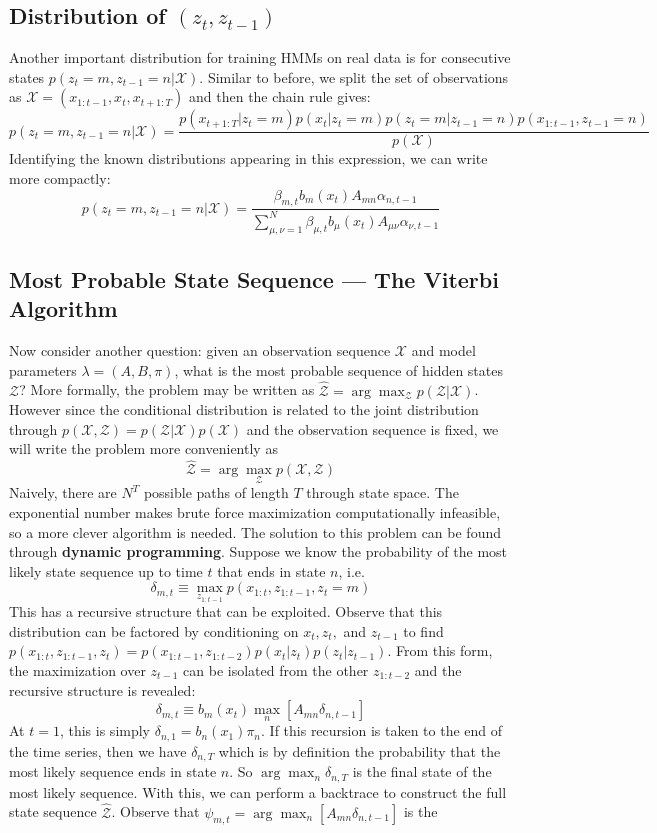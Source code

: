 \documentclass[onecolumn]{gwclass}
\begin{document}
	\subsection{Distribution of $(z_t,z_{t-1})$}
	Another important distribution for training HMMs on real data is for consecutive states $p(z_t=m,z_{t-1}=n|\mathcal{X})$. Similar to before, we split the set of observations as $\mathcal{X}=(x_{1:t-1}, x_t, x_{t+1:T})$ and then the chain rule gives:
	$$p(z_t=m,z_{t-1}=n|\mathcal{X}) = \frac{p(x_{t+1:T}|z_t=m)p(x_t|z_t=m)p(z_t=m|z_{t-1}=n)p(x_{1:t-1},z_{t-1}=n)}{p(\mathcal{X})}$$
	Identifying the known distributions appearing in this expression, we can write more compactly:
	$$ p(z_t=m,z_{t-1}=n|\mathcal{X}) = \frac{\beta_{m,t}b_m(x_t)A_{mn}\alpha_{n,t-1} }{\sum_{\mu,\nu=1}^N \beta_{\mu,t}b_\mu(x_t)A_{\mu\nu}\alpha_{\nu,t-1} } $$
	
	\subsection{Most Probable State Sequence --- The Viterbi Algorithm}
	Now consider another question: given an observation sequence $\mathcal{X}$ and model parameters $\lambda=(A,B,\pi)$, what is the most probable sequence of hidden states $\mathcal{Z}$? More formally, the problem may be written as $ \hat{\mathcal{Z}} = \arg\max_\mathcal{Z} p(\mathcal{Z}|\mathcal{X}) $. However since the conditional distribution is related to the joint distribution through $p(\mathcal{X},\mathcal{Z})=p(\mathcal{Z}|\mathcal{X})p(\mathcal{X})$ and the observation sequence is fixed, we will write the problem more conveniently as
	$$\hat{\mathcal{Z}}=\arg\max_\mathcal{Z} p(\mathcal{X},\mathcal{Z})$$
	Naively, there are $N^T$ possible paths of length $T$ through state space. The exponential number makes brute force maximization computationally infeasible, so a more clever algorithm is needed. The solution to this problem can be found through \textbf{dynamic programming}. Suppose we know the probability of the most likely state sequence up to time $t$ that ends in state $n$, i.e.
	$$ \delta_{m,t} \equiv \max_{z_{1:t-1}} p(x_{1:t}, z_{1:t-1}, z_t=m) $$
	This has a recursive structure that can be exploited. Observe that this distribution can be factored by conditioning on $x_t, z_t,$ and $z_{t-1}$ to find $p(x_{1:t}, z_{1:t-1}, z_t)=p(x_{1:t-1}, z_{1:t-2})p(x_t|z_t)p(z_t|z_{t-1})$. From this form, the maximization over $z_{t-1}$ can be isolated from the other $z_{1:t-2}$ and the recursive structure is revealed:
	$$ \delta_{m,t} \equiv b_m(x_t) \max_n \left[ A_{mn} \delta_{n,t-1} \right] $$
	At $t=1$, this is simply $\delta_{n,1}=b_n(x_1)\pi_n$. If this recursion is taken to the end of the time series, then we have $\delta_{n,T}$ which is by definition the probability that the most likely sequence ends in state $n$. So $\arg\max_n \delta_{n,T} $ is the final state of the most likely sequence. With this, we can perform a backtrace to construct the full state sequence $\hat{\mathcal{Z}}$. Observe that $\psi_{m,t} = \arg\max_n [A_{mn}\delta_{n,t-1}]$ is the 
\end{document}

